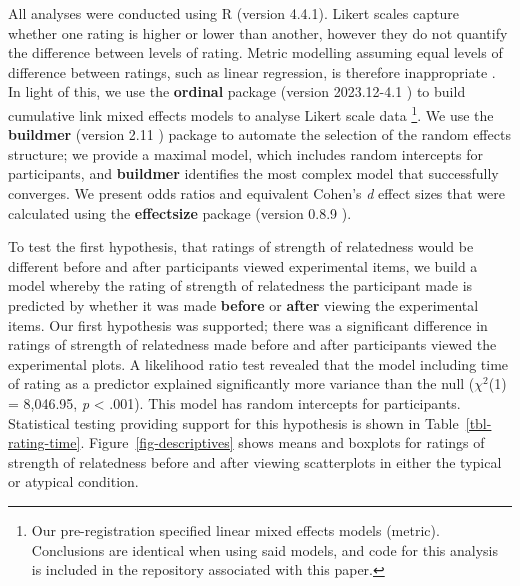 \documentclass[manuscript,screen,review,anonymous]{acmart}
\begin{document}
All analyses were conducted using R (version 4.4.1). Likert scales
capture whether one rating is higher or lower than another, however they
do not quantify the difference between levels of rating. Metric
modelling assuming equal levels of difference between ratings, such as
linear regression, is therefore inappropriate \citep{liddell_2018}. In
light of this, we use the \textbf{ordinal} package (version 2023.12-4.1
\citep{ordinal}) to build cumulative link mixed effects models to
analyse Likert scale data \footnote{Our pre-registration specified
  linear mixed effects models (metric). Conclusions are identical when
  using said models, and code for this analysis is included in the
  repository associated with this paper.}. We use the \textbf{buildmer}
(version 2.11 \citep{buildmer}) package to automate the selection of the
random effects structure; we provide a maximal model, which includes
random intercepts for participants, and \textbf{buildmer} identifies the
most complex model that successfully converges. We present odds ratios
and equivalent Cohen's \emph{d} effect sizes that were calculated using
the \textbf{effectsize} package (version 0.8.9 \citep{effectsize}).

To test the first hypothesis, that ratings of strength of relatedness
would be different before and after participants viewed experimental
items, we build a model whereby the rating of strength of relatedness
the participant made is predicted by whether it was made \textbf{before}
or \textbf{after} viewing the experimental items. Our first hypothesis
was supported; there was a significant difference in ratings of strength
of relatedness made before and after participants viewed the
experimental plots. A likelihood ratio test revealed that the model
including time of rating as a predictor explained significantly more
variance than the null (\(\chi^2\)(1) = 8,046.95, \emph{p} \textless{}
.001). This model has random intercepts for participants. Statistical
testing providing support for this hypothesis is shown in
Table~\ref{tbl-rating-time}. Figure~\ref{fig-descriptives} shows means
and boxplots for ratings of strength of relatedness before and after
viewing scatterplots in either the typical or atypical condition.

\begin{table}

\caption{\label{tbl-rating-time}Statistics for the significant main
effect of rating time. Odds ratio and the equivalent Cohen's \textit{d}
value is also supplied.}


\end{table}%
\end{document}
